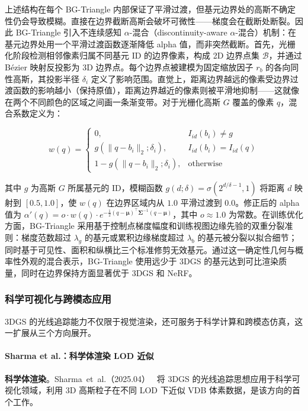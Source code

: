 上述结构在每个 BG-Triangle 内部保证了平滑过渡，但基元边界处的高斯不确定性仍会导致模糊。直接在边界截断高斯会破坏可微性——梯度会在截断处断裂。因此 BG-Triangle 引入不连续感知 $\alpha$-混合（discontinuity-aware $\alpha$-混合）机制：在基元边界处用一个平滑过渡函数逐渐降低 alpha 值，而非突然截断。首先，光栅化阶段检测相邻像素归属不同基元 ID 的边界像素，构成 2D 边界点集 $\mathcal{B}$，并通过 B\'{e}zier 映射反投影为 3D 边界点。每个边界点被建模为固定缩放因子 $r_b$ 的各向同性高斯，其投影半径 $\delta_i$ 定义了影响范围。直觉上，距离边界越远的像素受边界过渡函数的影响越小（保持原值），距离边界越近的像素则被平滑地抑制——这就像在两个不同颜色的区域之间画一条渐变带。对于光栅化高斯 $G$ 覆盖的像素 $q$，混合系数定义为：

\begin{equation}
w(q) = \begin{cases} 0, & I_{id}(b_i) \neq g \\ g(\|q - b_i\|_2; \delta_i), & I_{id}(b_i) = I_{id}(q) \\ 1 - g(\|q - b_i\|_2; \delta_i), & \text{otherwise} \end{cases}
\end{equation}

其中 $g$ 为高斯 $G$ 所属基元的 ID，模糊函数 $g(d;\delta) = \sigma(2^{d/\delta-1}, 1)$ 将距离 $d$ 映射到 $[0.5, 1.0]$，使 $w(q)$ 在边界区域内从 $1.0$ 平滑过渡到 $0.0$。修正后的 alpha 值为 $\alpha'(q) = o \cdot w(q) \cdot e^{-\frac{1}{2}(q-\boldsymbol{\mu})^\top \boldsymbol{\Sigma}^{-1}(q-\boldsymbol{\mu})}$，其中 $o \approx 1.0$ 为常数。在训练优化方面，BG-Triangle 采用基于控制点梯度幅度和训练视图边缘先验的双重分裂准则：梯度范数超过 $\lambda_g$ 的基元或累积边缘梯度超过 $\lambda_b$ 的基元被分裂以拟合细节；同时基于可见性、面积和纵横比三个标准修剪无效基元。通过这一确定性几何与概率性外观的混合表示，BG-Triangle 使用远少于 3DGS 的基元达到可比渲染质量，同时在边界保持方面显著优于 3DGS 和 NeRF。

\subsubsection{科学可视化与跨模态应用}

3DGS 的光线追踪能力不仅限于视觉渲染，还可服务于科学计算和跨模态仿真，这一扩展从三个方向展开。

\paragraph{Sharma et al.：科学体渲染 LOD 近似}
\textbf{科学体渲染}。Sharma~et~al.（2025.04）~\cite{2504_04857} 将 3DGS 的光线追踪思想应用于科学可视化领域，利用 3D 高斯粒子在不同 LOD 下近似 VDB 体素数据，是该方向的首个工作。

